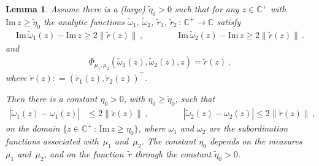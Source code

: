\documentclass[10pt,reqno]{amsart}
\numberwithin{equation}{section}
\theoremstyle{plain}
\newtheorem{lemma}[theorem]{Lemma}
\numberwithin{kevin}{section}
\theoremstyle{remark}
\newcommand{\im}{\mathrm{Im}\,}
\newcommand{\C}{{\mathbb C}}
\newcommand{\deq}{\mathrel{\mathop:}=}
\newcommand{\PP}{\Phi}
\begin{document}
\begin{lemma}\label{le lemma large eta}
Assume there is a (large) $\widetilde\eta_0>0$ such that for any $z\in\C^+$ with $\im z\ge \widetilde\eta_0$ the analytic functions $\widetilde\omega_1$, $\widetilde\omega_2$, $\widetilde{r}_1$, $\widetilde{r}_2\,:\,\C^+\rightarrow \C$ satisfy
\begin{align}\label{le lower bound on tilde omega}
\im \widetilde\omega_1(z)-\im z\ge 2\|\widetilde r(z)\|\,,\qquad\qquad \im \widetilde\omega_2(z)- \im z\ge 2\|\widetilde r(z)\|\,.
 \end{align}
and
\begin{align}\label{le other PP system}
  \PP_{\mu_1,\mu_2}(\widetilde\omega_1(z),\widetilde\omega_2(z),z)=\widetilde{r}(z)\,,
 \end{align}
where $\widetilde r(z)\deq(\widetilde{r}_1(z),\widetilde{r}_2(z))^\top$.
 
 Then there is a constant $\eta_0>0$, with $\eta_0 \ge \widetilde\eta_0$,  such that
 \begin{align}\label{le conclusion of large eta lemma}
 |\widetilde\omega_1(z)-\omega_1(z)|&\le 2\|\widetilde{r}(z)\|\,,\qquad\qquad|\widetilde\omega_2(z)-\omega_2(z)|\le 2\|\widetilde{r}(z)\|\,,
\end{align}
on the domain $\{z\in\C^+\,:\,\im z\ge \eta_0\}$, where $\omega_1$ and $\omega_2$ are the subordination functions associated with~$\mu_1$ and~$\mu_2$. The constant $\eta_0$ depends on the measures~$\mu_1$ and~$\mu_2$, and on the function~$\widetilde r$ through the constant $\widetilde\eta_0>0$.

\end{lemma}
\end{document}
